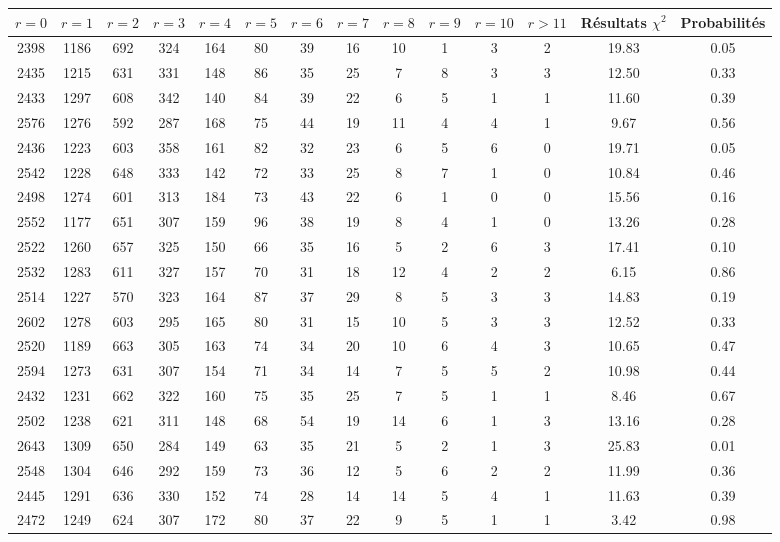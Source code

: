 \documentclass[12pt,a4paper]{article}
\begin{document}
\begin{center}
\begin{tabular}{|c|c|c|c|c|c|c|c|c|c|c|c|c|c|}
\hline
$r = 0$ & $r = 1$ & $r = 2$ & $r = 3$ & $r = 4$ & $r = 5$ & $r = 6$ & $r = 7$ & $r = 8$ & $r = 9$ & $r = 10$ & $r > 11$ & Résultats $\chi^2$ & Probabilités \\ \hline
2398 & 1186 & 692 & 324 & 164 & 80 & 39 & 16 & 10 & 1 & 3 & 2 & 19.83 &  0.05\\ \hline
2435 & 1215 & 631 & 331 & 148 & 86 & 35 & 25 & 7 & 8 & 3 & 3 & 12.50 &  0.33\\ \hline
2433 & 1297 & 608 & 342 & 140 & 84 & 39 & 22 & 6 & 5 & 1 & 1 & 11.60 &  0.39\\ \hline
2576 & 1276 & 592 & 287 & 168 & 75 & 44 & 19 & 11 & 4 & 4 & 1 &  9.67 &  0.56\\ \hline
2436 & 1223 & 603 & 358 & 161 & 82 & 32 & 23 & 6 & 5 & 6 & 0 & 19.71 &  0.05\\ \hline
2542 & 1228 & 648 & 333 & 142 & 72 & 33 & 25 & 8 & 7 & 1 & 0 & 10.84 &  0.46\\ \hline
2498 & 1274 & 601 & 313 & 184 & 73 & 43 & 22 & 6 & 1 & 0 & 0 & 15.56 &  0.16\\ \hline
2552 & 1177 & 651 & 307 & 159 & 96 & 38 & 19 & 8 & 4 & 1 & 0 & 13.26 &  0.28\\ \hline
2522 & 1260 & 657 & 325 & 150 & 66 & 35 & 16 & 5 & 2 & 6 & 3 & 17.41 &  0.10\\ \hline
2532 & 1283 & 611 & 327 & 157 & 70 & 31 & 18 & 12 & 4 & 2 & 2 &  6.15 &  0.86\\ \hline
2514 & 1227 & 570 & 323 & 164 & 87 & 37 & 29 & 8 & 5 & 3 & 3 & 14.83 &  0.19\\ \hline
2602 & 1278 & 603 & 295 & 165 & 80 & 31 & 15 & 10 & 5 & 3 & 3 & 12.52 &  0.33\\ \hline
2520 & 1189 & 663 & 305 & 163 & 74 & 34 & 20 & 10 & 6 & 4 & 3 & 10.65 &  0.47\\ \hline
2594 & 1273 & 631 & 307 & 154 & 71 & 34 & 14 & 7 & 5 & 5 & 2 & 10.98 &  0.44\\ \hline
2432 & 1231 & 662 & 322 & 160 & 75 & 35 & 25 & 7 & 5 & 1 & 1 &  8.46 &  0.67\\ \hline
2502 & 1238 & 621 & 311 & 148 & 68 & 54 & 19 & 14 & 6 & 1 & 3 & 13.16 &  0.28\\ \hline
2643 & 1309 & 650 & 284 & 149 & 63 & 35 & 21 & 5 & 2 & 1 & 3 & 25.83 &  0.01\\ \hline
2548 & 1304 & 646 & 292 & 159 & 73 & 36 & 12 & 5 & 6 & 2 & 2 & 11.99 &  0.36\\ \hline
2445 & 1291 & 636 & 330 & 152 & 74 & 28 & 14 & 14 & 5 & 4 & 1 & 11.63 &  0.39\\ \hline
2472 & 1249 & 624 & 307 & 172 & 80 & 37 & 22 & 9 & 5 & 1 & 1 &  3.42 &  0.98\\ \hline
\end{tabular}
\end{center}
\end{document}
